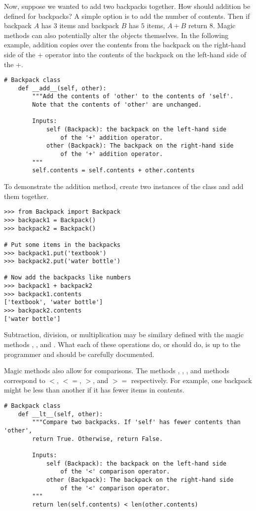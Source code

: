 Now, suppose we wanted to add two backpacks together.
How should addition be defined for backpacks?
A simple option is to add the number of contents.
Then if backpack $A$ has $3$ items and backpack $B$ has $5$ items, $A + B$ return $8$.
Magic methods can also potentially alter the objects themselves.
In the following example, addition copies over the contents from the backpack on the right-hand side of the $+$ operator into the contents of the backpack on the left-hand side of the $+$.

\begin{lstlisting}
# Backpack class
    def __add__(self, other):
        """Add the contents of 'other' to the contents of 'self'.
        Note that the contents of 'other' are unchanged.
        
        Inputs:
            self (Backpack): the backpack on the left-hand side
                of the '+' addition operator.
            other (Backpack): The backpack on the right-hand side
                of the '+' addition operator.
        """
        self.contents = self.contents + other.contents
\end{lstlisting}

To demonstrate the addition method, create two instances of the  class and add them together.

\begin{lstlisting}
>>> from Backpack import Backpack
>>> backpack1 = Backpack()
>>> backpack2 = Backpack()

# Put some items in the backpacks
>>> backpack1.put('textbook')
>>> backpack2.put('water bottle')

# Now add the backpacks like numbers
>>> backpack1 + backpack2
>>> backpack1.contents
['textbook', 'water bottle']
>>> backpack2.contents
['water bottle']
\end{lstlisting}

Subtraction, division, or multiplication may be similary defined with the magic methods , , and .
What each of these operations do, or should do, is up to the programmer and should be carefully documented.

Magic methods also allow for comparisons.
The methods , , , and  methods correspond to $<$, $<=$, $>$, and $>=$ respectively.
For example, one backpack might be less than another if it has fewer items in contents.

\begin{lstlisting}
# Backpack class
    def __lt__(self, other):
        """Compare two backpacks. If 'self' has fewer contents than 'other',
        return True. Otherwise, return False.
        
        Inputs:
            self (Backpack): the backpack on the left-hand side
                of the '<' comparison operator.
            other (Backpack): The backpack on the right-hand side
                of the '<' comparison operator.
        """
        return len(self.contents) < len(other.contents)
\end{lstlisting}


